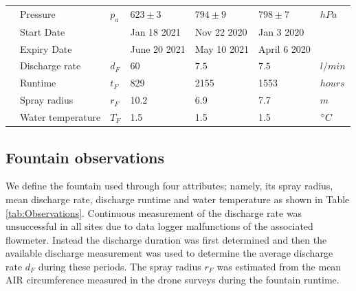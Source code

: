 \documentclass[utf8]{frontiersSCNS}
\begin{document}
\begin{table}
\begin{tabular}{@{}|lllllll|@{}}
		\multicolumn{1}{|l|}{} & Pressure                    & $p_a         $  & $623 \pm 3$   & $794 \pm 9$  &
		$798 \pm7$             & $hPa$                                                                                                     \\
		\multicolumn{1}{|l|}{} & Start Date         &     & Jan 18 2021   & Nov 22 2020
		                       & Jan 3 2020                       &                                                                      \\
		\multicolumn{1}{|l|}{} & Expiry Date      &     & June 20 2021 & May 10 2021
		                       & April 6 2020                &                                                                      \\\bottomrule
		\multicolumn{1}{|l|}{\multirow{4}{*}{\rotatebox[origin=c]{90}{Fountain}}}
		                       & Discharge rate             & $d_F     $      & $60$          & $7.5$        &
		$7.5$                  & $l/min$                                                                                                   \\
		\multicolumn{1}{|l|}{} & Runtime                     & $t_F $          & 829           & 2155
		                       & 1553                        & $hours$                                                                     \\
		\multicolumn{1}{|l|}{} & Spray radius                & $r_{F}$         & 10.2          & 6.9
		                       & 7.7                         & $m$                                                                         \\
		\multicolumn{1}{|l|}{} & Water temperature           & $T_{F}$         & 1.5             & 1.5
		                       & 1.5                         & $\degree C$                                                                 \\\midrule
	\end{tabular}
\end{table}


\subsection{Fountain observations}

We define the fountain used through four attributes; namely, its spray radius, mean discharge rate, discharge
runtime and water temperature as shown in Table \ref{tab:Observations}. Continuous measurement of the discharge
rate was unsuccessful in all sites due to data logger malfunctions of the associated flowmeter. Instead the
discharge duration was first determined and then the available discharge measurement was used to determine the
average discharge rate $d_F$ during these periods.  The spray radius $r_F$ was estimated from the mean AIR
circumference measured in the drone surveys during the fountain runtime.
\end{document}
